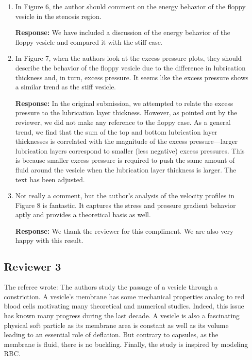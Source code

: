 \documentclass[11pt]{article}
\begin{document}
\begin{enumerate}
\item In Figure 6, the author should comment on the energy behavior of
  the floppy vesicle in the stenosis region.

\noindent
{\bf Response:} We have included a discussion of the energy behavior of
the floppy vesicle and compared it with the stiff case.

\item In Figure 7, when the authors look at the excess pressure plots,
  they should describe the behavior of the floppy vesicle due to the
  difference in lubrication thickness and, in turn, excess pressure. It
  seems like the excess pressure shows a similar trend as the stiff
  vesicle.

\noindent
{\bf Response:} In the original submission, we attempted to relate the
excess pressure to the lubrication layer thickness. However, as pointed
out by the reviewer, we did not make any reference to the floppy case.
As a general trend, we find that the sum of the top and bottom
lubrication layer thicknesses is correlated with the magnitude of the
excess pressure---larger lubrication layers correspond to smaller (less
negative) excess pressures. This is because smaller excess pressure is
required to push the same amount of fluid around the vesicle when the
lubrication layer thickness is larger. The text has been adjusted.


\item Not really a comment, but the author's analysis of the velocity
  profiles in Figure 8 is fantastic. It captures the stress and pressure
  gradient behavior aptly and provides a theoretical basis as well.

\noindent
{\bf Response:} We thank the reviewer for this compliment. We are also
very happy with this result. 


\end{enumerate}

\newpage

\subsection*{Reviewer 3}

The referee wrote: The authors study the passage of a vesicle through a
constriction. A vesicle’s membrane has some mechanical properties analog
to red blood cells motivating many theoretical and numerical studies.
Indeed, this issue has known many progress during the last decade. A
vesicle is also a fascinating physical soft particle as its membrane
area is constant as well as its volume leading to an essential role of
deflation. But contrary to capsules, as the membrane is fluid, there is
no buckling. Finally, the study is inspired by modeling RBC. 
\end{document}
